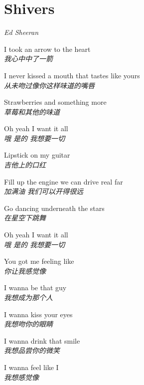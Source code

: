 \section{Shivers}

\thispagestyle{empty}


\begin{center}
\textit{Ed Sheeran}
\end{center}

\vspace{1em}

\begin{spacing}{1.5}
\begin{flushleft}
I took an arrow to the heart\\
\textit{我心中中了一箭}\lyricspace

I never kissed a mouth that tastes like yours\\
\textit{从未吻过像你这样味道的嘴唇}\lyricspace

Strawberries and something more\\
\textit{草莓和其他的味道}\lyricspace

Oh yeah I want it all\\
\textit{哦 是的 我想要一切}\lyricspace

Lipstick on my guitar\\
\textit{吉他上的口红}\lyricspace

Fill up the engine we can drive real far\\
\textit{加满油 我们可以开得很远}\lyricspace

Go dancing underneath the stars\\
\textit{在星空下跳舞}\lyricspace

Oh yeah I want it all\\
\textit{哦 是的 我想要一切}\lyricspace

You got me feeling like\\
\textit{你让我感觉像}\lyricspace

I wanna be that guy\\
\textit{我想成为那个人}\lyricspace

I wanna kiss your eyes\\
\textit{我想吻你的眼睛}\lyricspace

I wanna drink that smile\\
\textit{我想品尝你的微笑}\lyricspace

I wanna feel like I\\
\textit{我想感觉像}\lyricspace


\end{flushleft}
\end{spacing}
